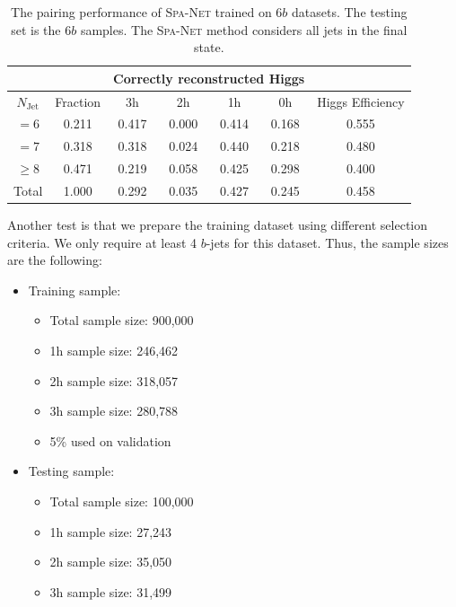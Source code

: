 \documentclass[12pt]{article}
\begin{document}
    \begin{table}[htpb]
		\centering
        \caption{The pairing performance of \textsc{Spa-Net} trained on $6b$ datasets. The testing set is the $6b$ samples. The \textsc{Spa-Net} method considers all jets in the final state.}
		\label{tab:resonant_6b_SPANet_pairing_6b_region}
		\begin{tabular}{c|c|cccc|c}
			\multicolumn{1}{l|}{} &          & \multicolumn{4}{c|}{Correctly reconstructed Higgs} & \multicolumn{1}{l}{} \\ \hline
			$N_\text{Jet}$        & Fraction & 3h          & 2h         & 1h         & 0h         & Higgs Efficiency     \\ \hline
			$=6$                  & 0.211 & 0.417 & 0.000 & 0.414 & 0.168 & 0.555 \\
			$=7$                  & 0.318 & 0.318 & 0.024 & 0.440 & 0.218 & 0.480 \\
			$\ge 8$               & 0.471 & 0.219 & 0.058 & 0.425 & 0.298 & 0.400 \\ \hline
			Total                 & 1.000 & 0.292 & 0.035 & 0.427 & 0.245 & 0.458 
		\end{tabular}
	\end{table}

    Another test is that we prepare the training dataset using different selection criteria. We only require at least 4 $b$-jets for this dataset. Thus, the sample sizes are the following:
    \begin{itemize}
        \item Training sample:
        \begin{itemize}
            \item Total sample size: 900,000
            \item 1h sample size: 246,462
            \item 2h sample size: 318,057
            \item 3h sample size: 280,788
            \item 5\% used on validation
        \end{itemize}
        \item Testing sample:
        \begin{itemize}
            \item Total sample size: 100,000
            \item 1h sample size: 27,243
            \item 2h sample size: 35,050
            \item 3h sample size: 31,499
        \end{itemize}
    \end{itemize}
\end{document}
